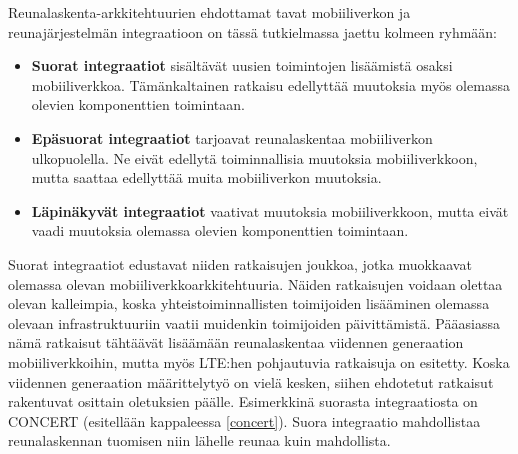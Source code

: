 Reunalaskenta-arkkitehtuurien ehdottamat tavat mobiiliverkon ja reunajärjestelmän integraatioon on tässä tutkielmassa jaettu kolmeen ryhmään:



\begin{itemize}
\item \textbf{Suorat integraatiot} sisältävät uusien toimintojen lisäämistä osaksi mobiiliverkkoa. Tämänkaltainen ratkaisu edellyttää muutoksia myös olemassa olevien komponenttien toimintaan. 
\item \textbf{Epäsuorat integraatiot} tarjoavat reunalaskentaa mobiiliverkon ulkopuolella. Ne eivät edellytä toiminnallisia muutoksia mobiiliverkkoon, mutta saattaa edellyttää muita mobiiliverkon muutoksia.
\item \textbf{Läpinäkyvät integraatiot} vaativat muutoksia mobiiliverkkoon, mutta eivät vaadi muutoksia olemassa olevien komponenttien toimintaan.
\end{itemize}

Suorat integraatiot edustavat niiden ratkaisujen joukkoa, jotka muokkaavat olemassa olevan mobiiliverkkoarkkitehtuuria.
Näiden ratkaisujen voidaan olettaa olevan kalleimpia, koska yhteistoiminnallisten toimijoiden lisääminen olemassa olevaan infrastruktuuriin vaatii muidenkin toimijoiden päivittämistä.
Pääasiassa nämä ratkaisut tähtäävät lisäämään reunalaskentaa viidennen generaation mobiiliverkkoihin, mutta myös LTE:hen pohjautuvia ratkaisuja on esitetty.
Koska viidennen generaation määrittelytyö on vielä kesken, siihen ehdotetut ratkaisut rakentuvat osittain oletuksien päälle.
Esimerkkinä suorasta integraatiosta on CONCERT (esitellään kappaleessa \ref{concert}). Suora integraatio mahdollistaa reunalaskennan tuomisen niin lähelle reunaa kuin mahdollista.

